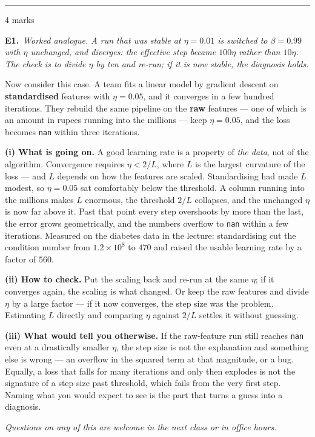 \documentclass[10pt,a4paper]{article}
\newcommand{\parthead}[2]{\vspace{2pt}\noindent\rule{\linewidth}{0.4pt}\par\vspace{2pt}%
  \noindent{\bfseries Part #1}\hfill{\small #2}\par\vspace{1pt}}
\begin{document}
\newpage

\parthead{E --- Reasoning}{4 marks}

\textbf{E1.}\ \emph{Worked analogue. A run that was stable at $\eta = 0.01$ is switched to $\beta = 0.99$ with $\eta$
unchanged, and diverges: the effective step became $100\eta$ rather than $10\eta$. The check is to divide
$\eta$ by ten and re-run; if it is now stable, the diagnosis holds.}

\vspace{2mm}
Now consider this case. A team fits a linear model by gradient descent on \textbf{standardised} features with
$\eta = 0.05$, and it converges in a few hundred iterations. They rebuild the same pipeline on the
\textbf{raw} features --- one of which is an amount in rupees running into the millions --- keep
$\eta = 0.05$, and the loss becomes \texttt{nan} within three iterations.

\vspace{4pt}

\textbf{(i) What is going on.} A good learning rate is a property of \emph{the data}, not of the algorithm. Convergence requires $\eta < 2/L$, where $L$ is the largest curvature of the loss --- and $L$ depends on how the features are scaled. Standardising had made $L$ modest, so $\eta = 0.05$ sat comfortably below the threshold. A column running into the millions makes $L$ enormous, the threshold $2/L$ collapses, and the unchanged $\eta$ is now far above it. Past that point every step overshoots by more than the last, the error grows geometrically, and the numbers overflow to \texttt{nan} within a few iterations. Measured on the diabetes data in the lecture: standardising cut the condition number from $1.2 \times 10^{8}$ to $470$ and raised the usable learning rate by a factor of $560$.\par\vspace{1mm}\textbf{(ii) How to check.} Put the scaling back and re-run at the same $\eta$; if it converges again, the scaling is what changed. Or keep the raw features and divide $\eta$ by a large factor --- if it now converges, the step size was the problem. Estimating $L$ directly and comparing $\eta$ against $2/L$ settles it without guessing.\par\vspace{1mm}\textbf{(iii) What would tell you otherwise.} If the raw-feature run still reaches \texttt{nan} even at a drastically smaller $\eta$, the step size is not the explanation and something else is wrong --- an overflow in the squared term at that magnitude, or a bug. Equally, a loss that falls for many iterations and only then explodes is not the signature of a step size past threshold, which fails from the very first step. Naming what you would expect to see is the part that turns a guess into a diagnosis.

\vfill

{\footnotesize\itshape Questions on any of this are welcome in the next class or in office hours.}

\newpage
\end{document}
